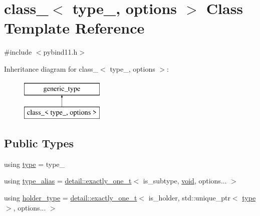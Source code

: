 \hypertarget{classclass__}{}\section{class\+\_\+$<$ type\+\_\+, options $>$ Class Template Reference}
\label{classclass__}


{\ttfamily \#include $<$pybind11.\+h$>$}

Inheritance diagram for class\+\_\+$<$ type\+\_\+, options $>$\+:\begin{figure}[H]
\begin{center}
\leavevmode
\includegraphics[height=2.000000cm]{classclass__}
\end{center}
\end{figure}
\subsection*{Public Types}
\begin{DoxyCompactItemize}
\item 
using \mbox{\hyperlink{classclass___a90e08a4ecffb596c1f1055f47747ad91}{type}} = type\+\_\+
\item 
using \mbox{\hyperlink{classclass___a18716f57a4db37eb2e5482309e5253c4}{type\+\_\+alias}} = \mbox{\hyperlink{detail_2common_8h_a9ec2c72f4073efb0fb0bd007b0616f0a}{detail\+::exactly\+\_\+one\+\_\+t}}$<$ is\+\_\+subtype, \mbox{\hyperlink{_s_d_l__opengles2__gl2ext_8h_ae5d8fa23ad07c48bb609509eae494c95}{void}}, options... $>$
\item 
using \mbox{\hyperlink{classclass___ad22258342739bda577366b3a13a98796}{holder\+\_\+type}} = \mbox{\hyperlink{detail_2common_8h_a9ec2c72f4073efb0fb0bd007b0616f0a}{detail\+::exactly\+\_\+one\+\_\+t}}$<$ is\+\_\+holder, std\+::unique\+\_\+ptr$<$ \mbox{\hyperlink{classclass___a90e08a4ecffb596c1f1055f47747ad91}{type}} $>$, options... $>$
\end{DoxyCompactItemize}
